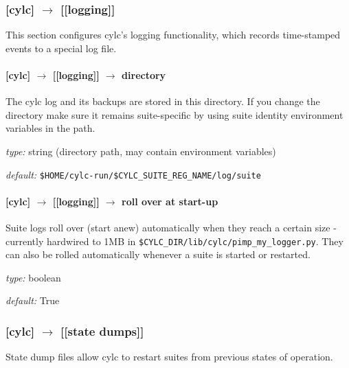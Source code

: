 \subsubsection[{[[}logging{]]} ]{[cylc] $\rightarrow$ [[logging]]}

This section configures cylc's logging functionality, which records
time-stamped events to a special log file. 

\paragraph[directory]{[cylc] $\rightarrow$ [[logging]] $\rightarrow$ directory}

The cylc log and its backups are stored in this directory. If you change
the directory make sure it remains suite-specific by using suite
identity environment variables in the path.

\begin{myitemize}
    \item {\em type:} string (directory path, may contain environment variables)
    \item {\em default:} \lstinline=$HOME/cylc-run/$CYLC_SUITE_REG_NAME/log/suite=
\end{myitemize}

\paragraph[roll over at start-up]{[cylc] $\rightarrow$ [[logging]] $\rightarrow$ roll over at start-up}

Suite logs roll over (start anew) automatically when they reach a
certain size - currently hardwired to 1MB in
\lstinline=$CYLC_DIR/lib/cylc/pimp_my_logger.py=. 
They can also be rolled automatically whenever a
suite is started or restarted.

\begin{myitemize}
    \item {\em type:} boolean
    \item {\em default:} True
\end{myitemize}

\subsubsection[{[[}state dumps{]]}]{ [cylc] $\rightarrow$ [[state dumps]] }

 State dump files allow cylc to restart suites from previous states of
 operation. 

